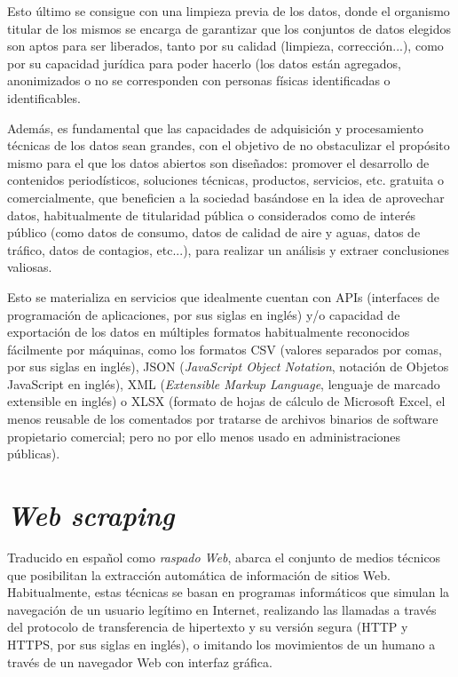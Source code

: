 Esto último se consigue con una limpieza previa de los datos, donde el organismo titular de los mismos se encarga de garantizar que los conjuntos de datos elegidos son aptos para ser liberados, tanto por su calidad (limpieza, corrección...), como por su capacidad jurídica para poder hacerlo (los datos están agregados, anonimizados o no se corresponden con personas físicas identificadas o identificables.

Además, es fundamental que las capacidades de adquisición y procesamiento técnicas de los datos sean grandes, con el objetivo de no obstaculizar el propósito mismo para el que los datos abiertos son diseñados: promover el desarrollo de contenidos periodísticos, soluciones técnicas, productos, servicios, etc. gratuita o comercialmente, que beneficien a la sociedad basándose en la idea de aprovechar datos, habitualmente de titularidad pública o considerados como de interés público (como datos de consumo, datos de calidad de aire y aguas, datos de tráfico, datos de contagios, etc...), para realizar un análisis y extraer conclusiones valiosas.

Esto se materializa en servicios que idealmente cuentan con APIs (interfaces de programación de aplicaciones, por sus siglas en inglés) y/o capacidad de exportación de los datos en múltiples formatos habitualmente reconocidos fácilmente por máquinas, como los formatos CSV (valores separados por comas, por sus siglas en inglés), JSON (\textit{JavaScript Object Notation}, notación de Objetos JavaScript en inglés), XML (\textit{Extensible Markup Language}, lenguaje de marcado extensible en inglés) o XLSX (formato de hojas de cálculo de Microsoft Excel, el menos reusable de los comentados por tratarse de archivos binarios de software propietario comercial; pero no por ello menos usado en administraciones públicas).

\section{\textit{Web scraping}}

Traducido en español como \textit{raspado Web}, abarca el conjunto de medios técnicos que posibilitan la extracción automática de información de sitios Web. Habitualmente, estas técnicas se basan en programas informáticos que simulan la navegación de un usuario legítimo en Internet, realizando las llamadas a través del protocolo de transferencia de hipertexto y su versión segura (HTTP y HTTPS, por sus siglas en inglés), o imitando los movimientos de un humano a través de un navegador Web con interfaz gráfica.

